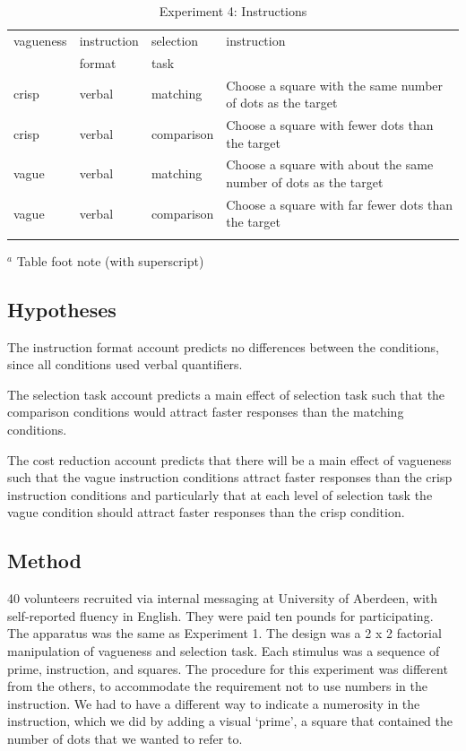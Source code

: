 \documentclass[graybox,envcountchap,sectrefs%
,footinfo
]{svmono}
\begin{document}
\begin{table}
\caption{Experiment 4: Instructions}
\label{instructionse4}
\begin{tabular}{llll}
\hline\noalign{\smallskip}
vagueness&instruction 	& selection&instruction\\
		& format		& task	 &\\
\noalign{\smallskip}\svhline\noalign{\smallskip}
crisp 	& verbal	&matching 	& Choose a square with the same number of dots as the target \\ 
crisp 	& verbal	&comparison	& Choose a square with fewer dots than the target \\
vague 	& verbal	&matching 	& Choose a square with about the same number of dots as the target \\ 
vague 	& verbal	&comparison	& Choose a square with far fewer dots than the target \\ 
\noalign{\smallskip}\hline\noalign{\smallskip}
\end{tabular}
$^a$ Table foot note (with superscript)\\
\end{table}


\subsection{Hypotheses}
The instruction format account predicts no differences between the conditions, since all conditions used verbal quantifiers.

The selection task account predicts a main effect of selection task such that the comparison conditions would attract faster responses than the matching conditions.

The cost reduction account predicts that there will be a main effect of vagueness such that the vague instruction conditions attract faster responses than the crisp instruction conditions and particularly that at each level of selection task the vague condition should attract faster responses than the crisp condition.

\subsection{Method}

40 volunteers recruited via internal messaging at University of Aberdeen, with self-reported fluency in English. They were paid ten pounds for participating. 
The apparatus was the same as Experiment 1.
The design was a 2 x 2 factorial manipulation of vagueness and selection task.
Each stimulus was a sequence of prime, instruction, and squares.
The procedure for this experiment was different from the others, to accommodate the requirement not to use numbers in the instruction. We had to have a different way to indicate a numerosity in the instruction, which we did by adding a visual `prime', a square that contained the number of dots that we wanted to refer to.
\end{document}
